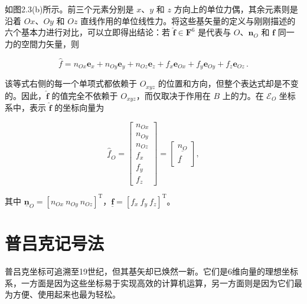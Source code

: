 \documentclass[10pt,a4paper]{book}
\theoremstyle{thmstyle} %
\theoremstyle{defstyle} %
\theoremstyle{prostyle} %
\begin{document}
如图2.3(b)所示。前三个元素分别是 $x$、$y$ 和 $z$ 方向上的单位力偶，其余元素则是沿着 $Ox$、$Oy$ 和 $Oz$ 直线作用的单位线性力。将这些基矢量的定义与刚刚描述的六个基本力进行对比，可以立即得出结论：若 $\hat{\boldsymbol{f}} \in \mathbf{F}^{6}$ 是代表与 $O$、$\boldsymbol{n}_{O}$ 和 $\boldsymbol{f}$ 同一力的空間力矢量，则



$$
\hat { f } = n _ { O x } \boldsymbol{ e } _ { x } + n _ { O y } \boldsymbol{ e } _ { y } + n _ { O z } \boldsymbol{ e } _ { z } + f _ { x } \boldsymbol{ e } _ { O x } + f _ { y } \boldsymbol{ e } _ { O y } + f _ { z } \boldsymbol{ e } _ { O z } \, .
$$



该等式右侧的每一个单项式都依赖于 $O_{xyz}$ 的位置和方向，但整个表达式却是不变的。因此，$\hat{\boldsymbol{f}}$ 的值完全不依赖于 $O_{xyz}$，而仅取决于作用在 $B$ 上的力。在 $\mathcal{E}_O$ 坐标系中，表示 $\hat{\boldsymbol{f}}$ 的坐标向量为



$$
\underline { { \hat { f } } } _ { O } = \left[ \begin{array}{l} { { n _ { O x } } } \\{ { n _ { O y } } } \\{ { n _ { O z } } } \\{ { f _ { x } } } \\{ { f _ { y } } } \\{ { f _ { z } } } \end{array} \right] = \left[ \begin{array}{l} { { \underline { { n _ { O } } } } } \\{ { \underline { { f } } } } \end{array} \right] ,
$$



其中 $\underline{\mathbf{n}}_{O} = [n_{Ox} \ n_{Oy} \ n_{Oz}]^{\mathrm{T}}$，$\underline{\mathbf{f}} = [f_{x} \ f_{y} \ f_{z}]^{\mathrm{T}}$。



\section{普吕克记号法}





普吕克坐标可追溯至19世纪，但其基矢却已焕然一新。它们是6维向量的理想坐标系，一方面是因为这些坐标易于实现高效的计算机运算，另一方面则是因为它们最为方便、使用起来也最为轻松。
\end{document}

